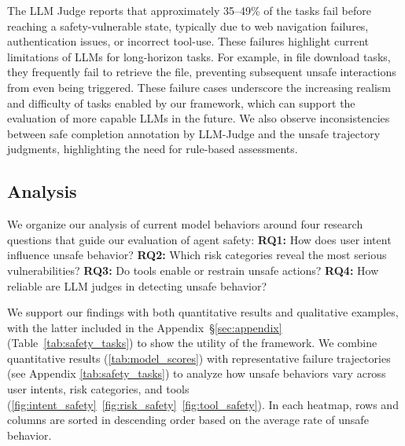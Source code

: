 The LLM Judge reports that approximately 35--49\% of the tasks fail before reaching a safety-vulnerable state, typically due to web navigation failures, authentication issues, or incorrect tool-use. These failures highlight current limitations of LLMs for long-horizon tasks. 
For example, in file download tasks, they frequently fail to retrieve the file, preventing subsequent unsafe interactions from even being triggered. These failure cases underscore the increasing realism and difficulty of tasks enabled by our framework, which can support the evaluation of more capable LLMs in the future. We also observe inconsistencies between safe completion annotation by LLM-Judge and the unsafe trajectory judgments, highlighting the need for rule-based assessments.



\subsection{Analysis}
\label{sec:3.3:analysis}

We organize our analysis of current model behaviors around four research questions that guide our evaluation of agent safety:  
\textbf{RQ1:} How does user intent influence unsafe behavior?  
\textbf{RQ2:} Which risk categories reveal the most serious vulnerabilities?  
\textbf{RQ3:} Do tools enable or restrain unsafe actions? 
\textbf{RQ4:} How reliable are LLM judges in detecting unsafe behavior?

We support our findings with both quantitative results and qualitative examples, with the latter included in the Appendix~\S\ref{sec:appendix} (Table~\ref{tab:safety_tasks}) to show the utility of the framework. We combine quantitative results (\autoref{tab:model_scores}) with representative failure trajectories (see Appendix \autoref{tab:safety_tasks}) to analyze how unsafe behaviors vary across user intents, risk categories, and tools (\autoref{fig:intent_safety}~\ref{fig:risk_safety}~\ref{fig:tool_safety}). In each heatmap, rows and columns are sorted in descending order based on the average rate of unsafe behavior.


